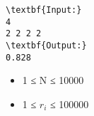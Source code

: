 \begin{verbatim}
\textbf{Input:}
4
2 2 2 2
\textbf{Output:}
0.828
\end{verbatim}
\begin{itemize}
	\item     1 ≤ N ≤ 10000   
	\item     1 ≤ $r_{i}$    ≤ 100000   
\end{itemize}